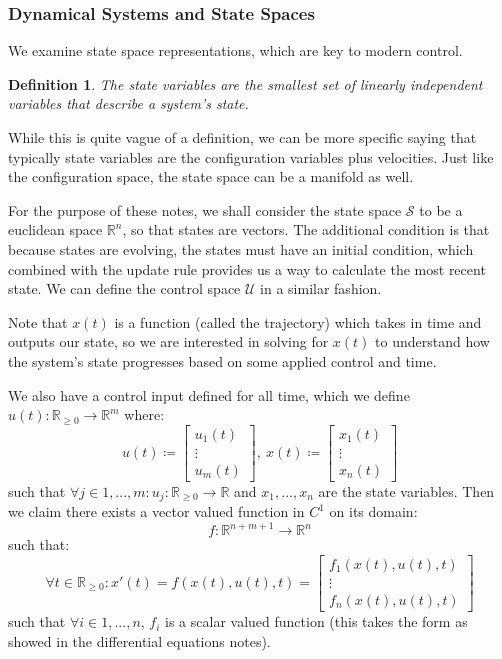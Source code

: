 \documentclass[10pt,letterpaper]{article} %
\newtheorem{defn}{Definition}[section]
\begin{document}
\subsubsection{Dynamical Systems and State Spaces}
We examine state space representations, which are key to modern control.

\begin{defn}
The state variables are the smallest set of linearly independent variables that describe a system's state.
\end{defn}
While this is quite vague of a definition, we can be more specific saying that typically state variables are the configuration variables plus velocities. Just like the configuration space, the state space can be a manifold as well.

For the purpose of these notes, we shall consider the state space $\mathcal{S}$ to be a euclidean space $\mathbb{R}^n$, so that states are vectors. The additional condition is that because states are evolving, the states must have an initial condition, which combined with the update rule provides us a way to calculate the most recent state.
We can define the control space $\mathcal{U}$ in a similar fashion.

Note that $x(t)$ is a function (called the trajectory) which takes in time and outputs our state, so we are interested in solving for $x(t)$ to understand how the system's state progresses based on some applied control and time.

We also have a control input defined for all time, which we define $u(t): \mathbb{R}_{\geqslant 0} \xrightarrow{} \mathbb{R}^m$ where:
\begin{equation*}
u(t) \coloneq \begin{bmatrix}
u_1(t)\\
\vdots\\
u_m(t)
\end{bmatrix}, \ x(t) \coloneq \begin{bmatrix}
x_1(t)\\
\vdots\\
x_n(t)
\end{bmatrix}
\end{equation*}
such that $\forall j \in 1, ..., m: u_j: \mathbb{R}_{\geqslant 0} \xrightarrow{} \mathbb{R}$ and $x_1, ..., x_n$ are the state variables. Then we claim there exists a vector valued function in $C^1$ on its domain:
\begin{equation*}
f: \mathbb{R}^{n+m+1} \xrightarrow{} \mathbb{R}^n
\end{equation*}
such that:
\begin{equation*}
\forall t \in \mathbb{R}_{\geqslant 0}: x'(t) = f(x(t), u(t), t) = \begin{bmatrix}
f_1(x(t), u(t), t)\\
\vdots\\
f_n(x(t), u(t), t)
\end{bmatrix}
\end{equation*}
such that $\forall i \in 1, ..., n$, $f_i$ is a scalar valued function (this takes the form as showed in the differential equations notes).
\end{document}
